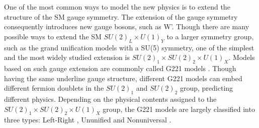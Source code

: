 One of the most common ways to model the new physics is to extend the structure of the SM gauge symmetry. The extension of the gauge symmetry consequently introduces new gauge bosons, such as W'. Though there are many possible ways to extend the SM $SU(2)_L \times U(1)_Y $ to a larger symmetry group, such as the grand unification models with a SU(5) symmetry, one of the simplest and the most widely studied extension is $SU(2)_1 \times SU(2)_2 \times U(1)_X $. Models based on such gauge extension are commonly called G221 models \cite{Hsieh:2010zr}. Though having the same underline gauge structure, different G221 models can embed different fermion doublets in the $SU(2)_1$ and $SU(2)_2$ group, predicting different physics. Depending on the physical contents assigned to the $SU(2)_1 \times SU(2)_2 \times U(1)_X $ group, the G221 models are largely classified into three types: Left-Right \cite{PhysRevD.11.2558}, Ununified \cite{Chivukula:1994qw, GEORGI1990541} and Nonuniversal \cite{PhysRevLett.47.1788, MULLER1997192, PhysRevD.81.015006}.




